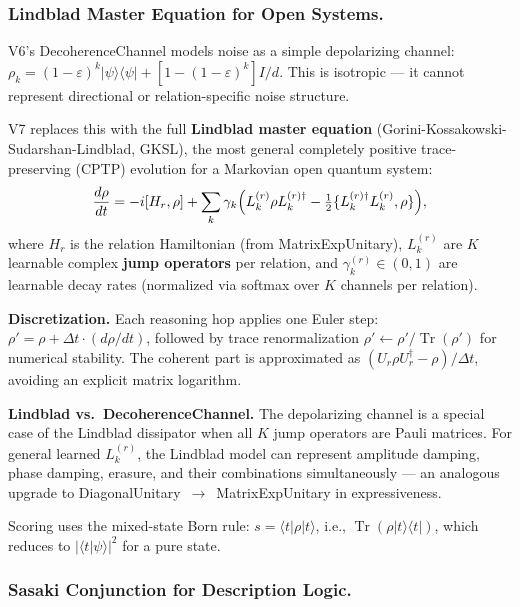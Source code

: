 \documentclass[runningheads]{llncs}
\newcommand{\eps}{\varepsilon}
\newcommand{\dagop}{^\dagger}
\newcommand{\ket}[1]{|#1\rangle}
\newcommand{\bra}[1]{\langle#1|}
\newcommand{\braket}[2]{\langle#1|#2\rangle}
\begin{document}
\subsubsection{Lindblad Master Equation for Open Systems.}
\label{sec:lindblad}

V6's DecoherenceChannel models noise as a simple depolarizing channel:
$\rho_k=(1-\eps)^k\ket\psi\bra\psi+[1-(1-\eps)^k]I/d$.  This is isotropic
--- it cannot represent directional or relation-specific noise structure.

V7 replaces this with the full \textbf{Lindblad master equation}
(Gorini-Kossakowski-Sudarshan-Lindblad, GKSL), the most general completely
positive trace-preserving (CPTP) evolution for a Markovian open quantum system:
\begin{equation}
  \frac{d\rho}{dt}
  = -i[H_r,\rho]
  + \sum_k\gamma_k\Bigl(L_k^{(r)}\rho L_k^{(r)\dagger}
    - \tfrac{1}{2}\{L_k^{(r)\dagger}L_k^{(r)},\rho\}\Bigr),
  \label{eq:lindblad}
\end{equation}
where $H_r$ is the relation Hamiltonian (from MatrixExpUnitary), $L_k^{(r)}$
are $K$ learnable complex \textbf{jump operators} per relation, and
$\gamma_k^{(r)}\in(0,1)$ are learnable decay rates (normalized via softmax
over $K$ channels per relation).

\textbf{Discretization.}
Each reasoning hop applies one Euler step:
$\rho'=\rho+\Delta t\cdot(d\rho/dt)$, followed by trace renormalization
$\rho'\leftarrow\rho'/\operatorname{Tr}(\rho')$ for numerical stability.
The coherent part is approximated as $(U_r\rho U_r\dagop-\rho)/\Delta t$,
avoiding an explicit matrix logarithm.

\textbf{Lindblad vs.\ DecoherenceChannel.}
The depolarizing channel is a special case of the Lindblad dissipator when
all $K$ jump operators are Pauli matrices.  For general learned $L_k^{(r)}$,
the Lindblad model can represent amplitude damping, phase damping, erasure,
and their combinations simultaneously --- an analogous upgrade to
DiagonalUnitary~$\rightarrow$~MatrixExpUnitary in expressiveness.

Scoring uses the mixed-state Born rule: $s=\braket{t}{\rho|t}$, i.e.,
$\operatorname{Tr}(\rho\ket{t}\bra{t})$, which reduces to $|\braket{t}\psi|^2$
for a pure state.

\subsubsection{Sasaki Conjunction for Description Logic.}
\label{sec:sasaki}
\end{document}
